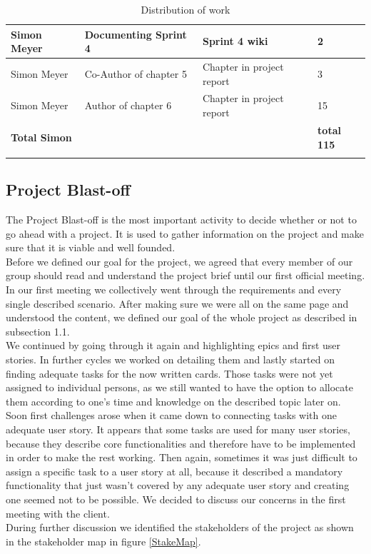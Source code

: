\begin{longtable}{|p{}||p{}|p{}|p{}|}
    \hline 
    Simon Meyer & Documenting Sprint 4 & Sprint 4 wiki & 2 \\ 
    \hline 
    Simon Meyer & Co-Author of chapter 5 & Chapter in project report & 3 \\ 
    \hline
    Simon Meyer & Author of chapter 6 & Chapter in project report & 15 \\ 
    \hline
    \hline 
    \textbf{Total \newline Simon} & & & \textbf{total 115}   \\
    \hline
    \hline
  \caption{Distribution of work}
\end{longtable}


\subsection{Project Blast-off}

The Project Blast-off is the most important activity to decide whether or not to go ahead with a project. It is used to gather information on the project and make sure that it is viable and well founded. \\ 
Before we defined our goal for the project, we agreed that every member of our group should read and understand the project brief until our first official meeting. In our first meeting we collectively went through the requirements and every single described scenario. After making sure we were all on the same page and understood the content, we defined our goal of the whole project as described in subsection 1.1. \\ 
We continued by going through it again and highlighting epics and first user stories. In further cycles we worked on detailing them and lastly started on finding adequate tasks for the now written cards. Those tasks were not yet assigned to individual persons, as we still wanted to have the option to allocate them according to one’s time and knowledge on the described topic later on. Soon first challenges arose when it came down to connecting tasks with one adequate user story. It appears that some tasks are used for many user stories, because they describe core functionalities and therefore have to be implemented in order to make the rest working. Then again, sometimes it was just difficult to assign a specific task to a user story at all, because it described a mandatory functionality that just wasn’t covered by any adequate user story and creating one seemed not to be possible. We decided to discuss our concerns in the first meeting with the client.\\ 
During further discussion we identified the stakeholders of the project as shown in the stakeholder map in figure \ref{StakeMap}. \\ 

